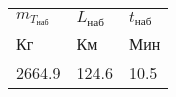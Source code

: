 \begin{tabular}{lll}
$m_{T_{наб}}$ & $L_{наб}$ & $t_{наб}$ \\
Кг & Км & Мин \\
2664.9 & 124.6 & 10.5 \\
\end{tabular}
